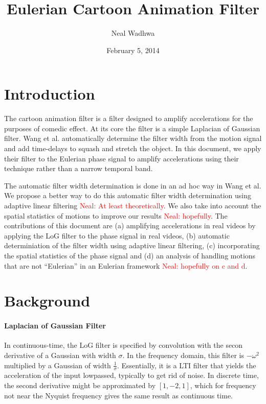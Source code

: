 \documentclass[letterpaper, 10pt]{article}
\author{Neal Wadhwa}
\title{Eulerian Cartoon Animation Filter}
\date{February 5, 2014}
\newcommand{\tmop}[1]{\operatorname{#1}}
\newcommand{\neal}[1]{\textcolor{red}{Neal: #1}}
\numberwithin{equation}{section}
\begin{document}
\newcommand{\D}{\mathcal{D}}
\newcommand{\pr}{\tmop{Pr}}
\newcommand{\R}{\mathbb{R}}
\newcommand{\beq}{\begin{equation}}
\newcommand{\eeq}{\end{equation}}
\newcommand{\E}{\mathbb{E}}
\newcommand{\Var}{\text{Var}}
\noindent
\maketitle
\section{Introduction}
The cartoon animation filter is a filter designed to amplify accelerations for the purposes of comedic effect. At its core the filter is a simple Laplacian of Gaussian filter. Wang et al. automatically determine the filter width from the motion signal and add time-delays to squash and stretch the object. In this document, we apply their filter to the Eulerian phase signal to amplify accelerations using their technique rather than a narrow temporal band. 

The automatic filter width determination is done in an ad hoc way in Wang et al. We propose a better way to do this automatic filter width determination using adaptive linear filtering \neal{At least theoretically}. We also take into account the spatial statistics of motions to improve our results \neal{hopefully}. The contributions of this document are (a) amplifying accelerations in real videos by applying the LoG filter to the phase signal in real videos, (b) automatic determiniation of the filter width using adaptive linear filtering, (c) incorporating the spatial statistics of the phase signal and  (d) an analysis of handling motions that are not ``Eulerian'' in an Eulerian framework \neal{hopefully on c and d}. 

\section{Background}
\paragraph{Laplacian of Gaussian Filter} In continuous-time, the LoG filter is specified by convolution with the secon derivative of a Gaussian with width $\sigma$. In the frequency domain, this filter is $-\omega^2$ multiplied by a Gaussian of width $\frac{1}{\sigma}$. Essentially, it is a LTI filter that yields the acceleration of the input lowpassed, typically to get rid of noise. In discrete time, the second derivative might be approximated by $[1, -2, 1]$, which for frequency not near the Nyquist frequency gives the same result as continuous time.
\end{document}
